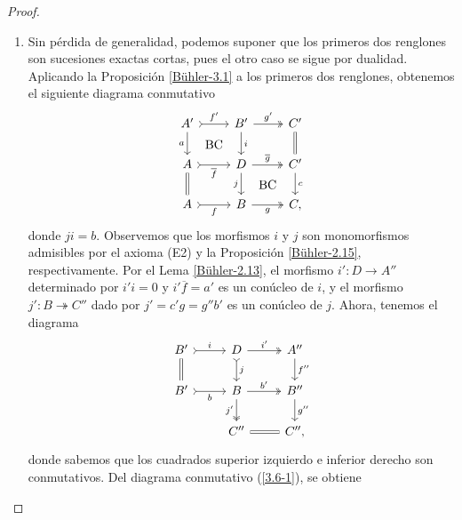 \documentclass[tesis]{subfiles}
\begin{document}
\begin{proof}\leavevmode
    \begin{enumerate}[label=(\alph*)]
    
        \item Sin pérdida de generalidad, podemos suponer que los primeros dos renglones son sucesiones exactas cortas, pues el otro caso se sigue por dualidad. Aplicando la Proposición \ref{Bühler-3.1} a los primeros dos renglones, obtenemos el siguiente diagrama conmutativo
             \begin{equation}\label{3.6-1}
                 \begin{tikzcd}
                     A' \arrow[]{d}[swap]{a} \arrow[phantom]{dr}[]{\text{BC}} \arrow[tail]{r}[]{f'} &B' \arrow[]{d}[]{i} \arrow[two heads]{r}[]{g'} &C' \arrow[equals]{d}[]{} \\
                     A \arrow[equals]{d}[]{} \arrow[tail]{r}[swap]{\overline{f}} &D \arrow[]{d}[swap]{j} \arrow[two heads]{r}[]{\overline{g}} &C' \arrow[]{d}[]{c} \\
                     A \arrow[tail]{r}[swap]{f} &B \arrow[two heads]{r}[swap]{g} &C, \arrow[phantom]{ul}[]{\text{BC}}
                 \end{tikzcd}
             \end{equation}
             donde $ji=b$. Observemos que los morfismos $i$ y $j$ son monomorfismos admisibles por el axioma (E2) y la Proposición \ref{Bühler-2.15}, respectivamente. Por el Lema \ref{Bühler-2.13}, el morfismo $i':D\to A''$ determinado por $i'i=0$ y $i'\overline{f}=a'$ es un conúcleo de $i$, y el morfismo $j':B\twoheadrightarrow C''$ dado por $j'=c'g=g''b'$ es un conúcleo de $j$. Ahora, tenemos el diagrama
             \begin{equation}\label{3.6-2}
                 \begin{tikzcd}
                     B' \arrow[equals]{d}[]{} \arrow[tail]{r}[]{i} &D \arrow[tail]{d}[]{j} \arrow[two heads]{r}[]{i'} &A'' \arrow[]{d}[]{f''} \\
                     B' \arrow[tail]{r}[swap]{b} &B \arrow[two heads]{d}[swap]{j'} \arrow[two heads]{r}[]{b'} &B'' \arrow[]{d}[]{g''} \\
                                                 &C'' \arrow[equals]{r}[]{} &C'',
                 \end{tikzcd}
             \end{equation}
             donde sabemos que los cuadrados superior izquierdo e inferior derecho son conmutativos. Del diagrama conmutativo (\ref{3.6-1}), se obtiene

\end{enumerate}
\end{proof}
\end{document}

